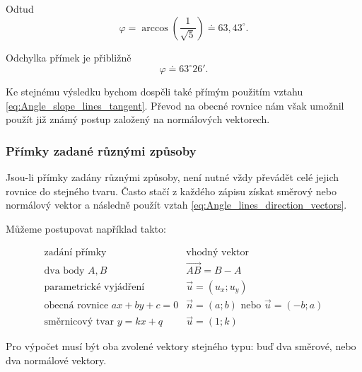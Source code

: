 \begin{example}
    Odtud
    \[
        \varphi
        =
        \arccos\left(\frac{1}{\sqrt5}\right)
        \doteq
        63{,}43^\circ.
    \]

    Odchylka přímek je přibližně
    \[
        \varphi\doteq63^\circ26'.
    \]

    Ke stejnému výsledku bychom dospěli také přímým použitím vztahu
    \eqref{eq:Angle_slope_lines_tangent}. Převod na obecné rovnice
    nám však umožnil použít již známý postup založený na normálových
    vektorech.
\end{example}


\subsubsection{Přímky zadané různými způsoby}
\label{subsubsec:Angle_lines_mixed_forms}

Jsou-li přímky zadány různými způsoby, není nutné vždy převádět celé
jejich rovnice do stejného tvaru. Často stačí z každého zápisu získat
směrový nebo normálový vektor a následně použít vztah
\eqref{eq:Angle_lines_direction_vectors}.

Můžeme postupovat například takto:

\[
\begin{array}{c|c}
    \text{zadání přímky}
    &
    \text{vhodný vektor}
    \\
    \hline
    \text{dva body }A,B
    &
    \overrightarrow{AB}=B-A
    \\[1mm]
    \text{parametrické vyjádření}
    &
    \vec{u}=(u_x;u_y)
    \\[1mm]
    \text{obecná rovnice }ax+by+c=0
    &
    \vec{n}=(a;b)
    \text{ nebo }
    \vec{u}=(-b;a)
    \\[1mm]
    \text{směrnicový tvar }y=kx+q
    &
    \vec{u}=(1;k)
\end{array}
\]

Pro výpočet musí být oba zvolené vektory stejného typu: buď dva
směrové, nebo dva normálové vektory.

